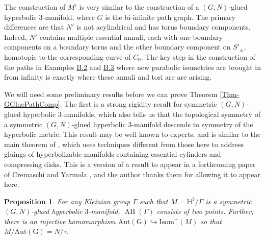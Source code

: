 \documentclass[11pt,leqno]{article}
\DeclareMathOperator{\AH}{AH}
\newtheorem{prop}[lemma]{Proposition}
\theoremstyle{introdef}
\numberwithin{lemma}{section}
\theoremstyle{definition}
\begin{document}
The construction of $M'$ is very similar to the construction of a $(G,N)$-glued hyperbolic $3$-manifold, where $G$ is the bi-infinite path graph. The primary differences are that $N'$ is not acylindrical and has torus boundary components. Indeed, $N'$ contains multiple essential annuli, each with one boundary components on a boundary torus and the other boundary component on $S'_{\pm}$, homotopic to the corresponding curve of $C_0$. The key step in the construction of the paths in Examples \hyperlink{Ex-CuspRank}{B.2} and \hyperlink{Ex-NonTame}{B.3} where new parabolic isometries are brought in from infinity is exactly where these annuli and tori are are arising.\par

We will need some preliminary results before we can prove Theorem \ref{Thm-GGluePathComp}. The first is a strong rigidity result for symmetric $(G,N)$-glued hyperbolic $3$-manifolds, which also tells us that the topological symmetry of a symmetric $(G,N)$-glued hyperbolic $3$-manifold descends to symmetry of the hyperbolic metric. This result may be well known to experts, and is similar to the main theorem of \cite{BrockMinskyNamaziSouto}, which uses techniques different from those here to address gluings of hyperbolizable manifolds containing essential cylinders and compressing disks. This is a version of a result to appear in a forthcoming paper of Cremaschi and Yarmola \cite{CREMYAR}, and the author thanks them for allowing it to appear here.


\begin{prop}
\label{Prop-GGluedUnique}
    For any Kleinian group $\Gamma$ such that $M=\mathbb{H}^3/\Gamma$ is a symmetric $(G,N)$-glued hyperbolic $3$-manifold, $\AH(\Gamma)$ consists of two points. Further, there is an injective homomorphism $\mathrm{Aut(G)}\hookrightarrow\mathrm{Isom}^+(M)$ so that $M/\mathrm{Aut(G)}=N/\tau$.
\end{prop}
\end{document}
